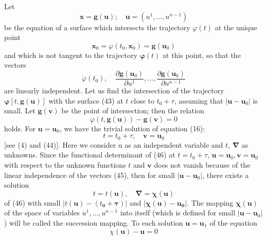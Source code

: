 \documentclass[10pt,a5paper]{book}
\theoremstyle{plain}
\theoremstyle{definition}
\theoremstyle{remark}
\begin{document}
Let
\begin{equation*}
\mathbf{x}=\mathbf{g}(\mathbf{u}) ; \quad \mathbf{u}=\left(u^{1}, \ldots, u^{n-1}\right) \tag{43}
\end{equation*}
be the equation of a surface which intersects the trajectory $\varphi(t)$ at the unique point
\begin{equation*}
\mathbf{x}_{0}=\varphi\left(t_{0}, \mathbf{x}_{0}\right)=\mathbf{g}\left(\mathbf{u}_{0}\right) \tag{44}
\end{equation*}
and which is not tangent to the trajectory $\boldsymbol{\varphi}(t)$ at this point, so that the
vectors
\begin{equation*}
\dot{\varphi}\left(t_{0}\right), \quad \frac{\partial \mathbf{g}\left(\mathbf{u}_{0}\right)}{\partial u^{1}}, \ldots, \frac{\partial \mathbf{g}\left(\mathbf{u}_{0}\right)}{\partial u^{n-1}} \tag{45}
\end{equation*}
are linearly independent. Let us find the intersection of the trajectory $\boldsymbol{\varphi}[t, \mathbf{g}(\mathbf{u})]$ with the surface (43) at $t$ close to $t_{0}+\tau$, assuming that $\left|\mathbf{u}-\mathbf{u}_{0}\right|$ is small. Let $\mathbf{g}(\mathbf{v})$ be the point of intersection; then the relation
\begin{equation*}
\varphi(t, \mathbf{g}(\mathbf{u}))-\mathbf{g}(\mathbf{v})=0 \tag{46}
\end{equation*}
holds. For $\mathbf{u}=\mathbf{u}_{0}$, we have the trivial solution of equation (16):
\[
t=t_{0}+\tau, \quad \mathbf{v}=\mathbf{u}_{0}
\]
[see (4) and (44)]. Here we consider u as an independent variable and $t$, $\boldsymbol{\nabla}$ as unknowns. Since the functional determinant of (46) at $t=t_{0}+\tau$, $\mathbf{u}=\mathbf{u}_{0}, \mathbf{v}=\mathbf{u}_{0}$ with respect to the unknown functions $t$ and $\mathbf{v}$ does not vanish because of the linear independence of the vectors (45), then for small $\left|\mathbf{u}-\mathbf{u}_{0}\right|$, there exists a solution
\[
t=t(\mathbf{u}), \quad \boldsymbol{\nabla}=\boldsymbol{\chi}(\mathbf{u})
\]
of (46) with small $\left|t(\mathbf{u})-\left(t_{\mathbf{0}}+\boldsymbol{\tau}\right)\right|$ and $\left|\boldsymbol{\chi}(\mathbf{u})-\mathbf{u}_{\mathbf{0}}\right|$. The mapping $\boldsymbol{\chi}(\mathbf{u})$ of the space of variables $u^{1}, \ldots, u^{n-1}$ into itself (which is defined for small $\left|\mathbf{u}-\mathbf{u}_{0}\right|$ ) will be called the succession mapping. To each solution $\mathbf{u}=\mathbf{u}_{1}$ of the equation
\begin{equation*}
\chi(\mathbf{u})-\mathbf{u}=0 \tag{47}
\end{equation*}
\end{document}
